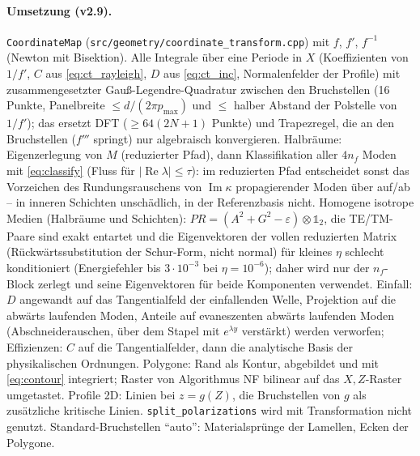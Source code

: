 \paragraph{Umsetzung (v2.9).} \verb|CoordinateMap| (\verb|src/geometry/coordinate_transform.cpp|) mit $f$, $f'$, $f^{-1}$
(Newton mit Bisektion). Alle Integrale über eine Periode in $X$ (Koeffizienten von $1/f'$, $C$ aus
\eqref{eq:ct_rayleigh}, $D$ aus \eqref{eq:ct_inc}, Normalenfelder der Profile) mit zusammengesetzter
Gauß-Legendre-Quadratur zwischen den Bruchstellen (16 Punkte, Panelbreite $\le d/(2\pi p_{\max})$ und
$\le$ halber Abstand der Polstelle von $1/f'$); das ersetzt DFT ($\ge64(2N+1)$ Punkte) und Trapezregel, die an den
Bruchstellen ($f'''$ springt) nur algebraisch konvergieren. Halbräume: Eigenzerlegung von $M$ (reduzierter Pfad), dann
Klassifikation aller $4n_f$ Moden mit \eqref{eq:classify} (Fluss für $|\operatorname{Re}\lambda|\le\tau$): im reduzierten
Pfad entscheidet sonst das Vorzeichen des Rundungsrauschens von $\operatorname{Im}\kappa$ propagierender Moden über
auf/ab -- in inneren Schichten unschädlich, in der Referenzbasis nicht. Homogene isotrope Medien (Halbräume und
Schichten): $PR=(A^2+G^2-\varepsilon)\otimes\mathbb 1_2$, die TE/TM-Paare sind exakt entartet und die Eigenvektoren der
vollen reduzierten Matrix (Rückwärtssubstitution der Schur-Form, nicht normal) für kleines $\eta$ schlecht konditioniert
(Energiefehler bis $3\cdot10^{-3}$ bei $\eta=10^{-6}$); daher wird nur der $n_f$-Block zerlegt und seine Eigenvektoren
für beide Komponenten verwendet. Einfall: $D$ angewandt auf das Tangentialfeld
der einfallenden Welle, Projektion auf die abwärts laufenden Moden, Anteile auf evaneszenten abwärts laufenden Moden
(Abschneiderauschen, über dem Stapel mit $e^{\lambda y}$ verstärkt) werden verworfen; Effizienzen: $C$ auf die Tangentialfelder, dann die
analytische Basis der physikalischen Ordnungen. Polygone: Rand als Kontur, abgebildet und mit \eqref{eq:contour}
integriert; Raster von Algorithmus NF bilinear auf das $X,Z$-Raster umgetastet. Profile 2D: Linien bei $z=g(Z)$, die
Bruchstellen von $g$ als zusätzliche kritische Linien. \verb|split_polarizations| wird mit Transformation nicht
genutzt. Standard-Bruchstellen \enquote{auto}: Materialsprünge der Lamellen, Ecken der Polygone.

